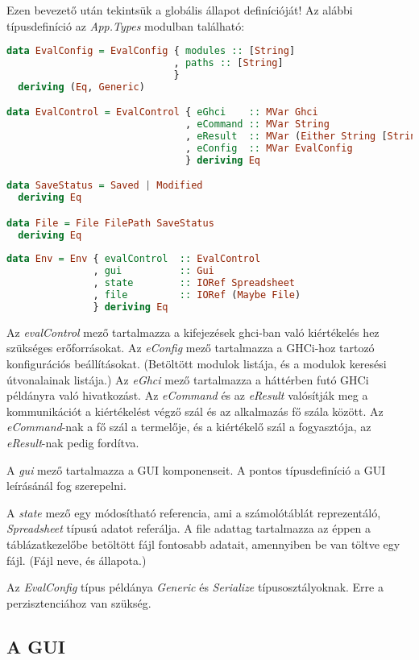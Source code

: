 Ezen bevezető után tekintsük a globális állapot definícióját! Az alábbi típusdefiníció az \textit{App.Types} modulban található:
\begin{lstlisting}[language={Haskell}]
data EvalConfig = EvalConfig { modules :: [String]
                             , paths :: [String]
                             }
  deriving (Eq, Generic)

data EvalControl = EvalControl { eGhci    :: MVar Ghci
                               , eCommand :: MVar String
                               , eResult  :: MVar (Either String [String])
                               , eConfig  :: MVar EvalConfig 
                               } deriving Eq

data SaveStatus = Saved | Modified
  deriving Eq

data File = File FilePath SaveStatus
  deriving Eq
  
data Env = Env { evalControl  :: EvalControl
               , gui          :: Gui
               , state        :: IORef Spreadsheet
               , file         :: IORef (Maybe File)
               } deriving Eq
\end{lstlisting}

Az \textit{evalControl} mező tartalmazza a kifejezések ghci-ban való kiértékelés hez szükséges erőforrásokat. Az \textit{eConfig} mező tartalmazza a GHCi-hoz tartozó konfigurációs beállításokat. (Betöltött modulok listája, és a modulok keresési útvonalainak listája.) Az \textit{eGhci} mező tartalmazza a háttérben futó GHCi példányra való hivatkozást. Az \textit{eCommand} és az \textit{eResult} valósítják meg a kommunikációt a kiértékelést végző szál és az alkalmazás fő szála között. Az \textit{eCommand}-nak a fő szál a termelője, és a kiértékelő szál a fogyasztója, az \textit{eResult}-nak pedig fordítva.

A \textit{gui} mező tartalmazza a GUI komponenseit. A pontos típusdefiníció a GUI leírásánál fog szerepelni.

A \textit{state} mező egy módosítható referencia, ami a számolótáblát reprezentáló, \textit{Spreadsheet} típusú adatot referálja. A file adattag tartalmazza az éppen a táblázatkezelőbe betöltött fájl fontosabb adatait, amennyiben be van töltve egy fájl. (Fájl neve, és állapota.)

Az \textit{EvalConfig} típus példánya \textit{Generic} és \textit{Serialize} típusosztályoknak. Erre a perzisztenciához van szükség.

\subsection{A GUI}


